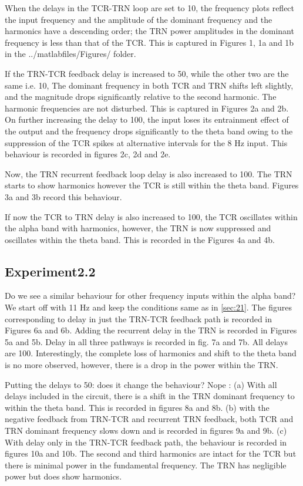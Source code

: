 \documentclass[11pt,a4paper]{article}
\begin{document}
When the delays in the TCR-TRN loop are set to 10, the frequency plots reflect the input frequency and the amplitude of the dominant frequency and the harmonics have a descending order; the TRN power amplitudes in the dominant frequency is less than that of the TCR. This is captured in Figures 1, 1a and 1b in the ../matlabfiles/Figures/ folder.

If the TRN-TCR feedback delay is increased to 50, while the other two are the same i.e. 10, The dominant frequency in both TCR and TRN shifts left slightly, and the magnitude drops significantly relative to the second harmonic. The harmonic frequencies are not disturbed. This is captured in Figures 2a and 2b. On further increasing the delay to 100, the input loses its entrainment effect of the output and the frequency drops significantly to the theta band owing to the suppression of the TCR spikes at alternative intervals for the 8 Hz input. This behaviour is recorded in figures 2c, 2d and 2e.

Now, the TRN recurrent feedback loop delay is also increased to 100. The TRN starts to show harmonics however the TCR is still within the theta band. Figures 3a and 3b record this behaviour.

If now the TCR to TRN delay is also increased to 100, the TCR oscillates within the alpha band with harmonics, however, the TRN is now suppressed and oscillates within the theta band. This is recorded in the Figures 4a and 4b.

\subsection{Experiment2.2}
\label{sec:22}
Do we see a similar behaviour for other frequency inputs within the alpha band?
We start off with 11 Hz and keep the conditions same as in \ref{sec:21}. The figures corresponding to delay in just the TRN-TCR feedback path is recorded in Figures 6a and 6b. Adding the recurrent delay in the TRN is recorded in Figures 5a and 5b. Delay in all three pathways is recorded in fig. 7a and 7b. 
All delays are 	100. 
Interestingly, the complete loss of harmonics and shift to the theta band is no more observed, however, there is a drop in the power within the TRN.

Putting the delays to 50: does it change the behaviour?
Nope :
(a) With all delays included in the circuit, there is a shift in the TRN dominant frequency to within the theta band. This is recorded in figures 8a and 8b.
(b) with the negative feedback from TRN-TCR and recurrent TRN feedback, both TCR and TRN dominant frequency slows down and is recorded in figures 9a and 9b.
(c) With delay only in the TRN-TCR feedback path, the behaviour is recorded in figures 10a and 10b. The second and third harmonics are intact for the TCR but there is minimal power in the fundamental frequency.
The TRN has negligible power but does show harmonics.
\end{document}
